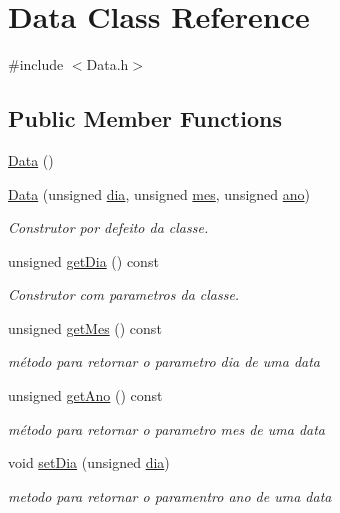 \hypertarget{class_data}{\section{Data Class Reference}
\label{class_data}
}


{\ttfamily \#include $<$Data.\+h$>$}

\subsection*{Public Member Functions}
\begin{DoxyCompactItemize}
\item 
\hyperlink{class_data_af11f741cb7f587e2e495452a8905a22a}{Data} ()
\item 
\hyperlink{class_data_ab1e8f6ca4094cbf13062f243fa2bb90b}{Data} (unsigned \hyperlink{class_data_a71a904380d17858da0b902e9a2563546}{dia}, unsigned \hyperlink{class_data_a586deb479ec2031a0d3ceec8280f7706}{mes}, unsigned \hyperlink{class_data_a1811fab972bdf6ed644c4eb7412bd043}{ano})
\begin{DoxyCompactList}\small\item\em Construtor por defeito da classe. \end{DoxyCompactList}\item 
unsigned \hyperlink{class_data_a07fe748ec046cb904c6854fb8b792786}{get\+Dia} () const 
\begin{DoxyCompactList}\small\item\em Construtor com parametros da classe. \end{DoxyCompactList}\item 
unsigned \hyperlink{class_data_a070387c9894b966ec8a175e3eb3c9c06}{get\+Mes} () const 
\begin{DoxyCompactList}\small\item\em método para retornar o parametro dia de uma data \end{DoxyCompactList}\item 
unsigned \hyperlink{class_data_a31f649c5a854de4750506a163955bb0b}{get\+Ano} () const 
\begin{DoxyCompactList}\small\item\em método para retornar o parametro mes de uma data \end{DoxyCompactList}\item 
void \hyperlink{class_data_ab3ea08211198373060bfd9aa7530ddff}{set\+Dia} (unsigned \hyperlink{class_data_a71a904380d17858da0b902e9a2563546}{dia})
\begin{DoxyCompactList}\small\item\em metodo para retornar o paramentro ano de uma data \end{DoxyCompactList}\item 

\end{DoxyCompactItemize}

